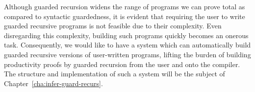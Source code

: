 Although guarded recursion widens the range of programs we can prove total as
compared to syntactic guardedness, it is evident that requiring the user to
write guarded recursive programs is not feasible due to their complexity. Even
disregarding this complexity, building such programs quickly becomes an onerous
task. Consequently, we would like to have a system which can automatically build
guarded recursive versions of user-written programs, lifting the burden of
building productivity proofs by guarded recursion from the user and onto the
compiler. The structure and implementation of such a system will be the subject
of Chapter~\ref{cha:infer-guard-recurs}.

